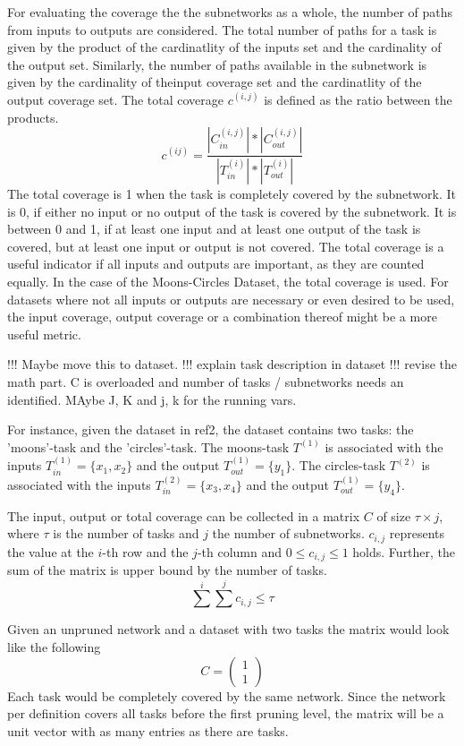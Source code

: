 For evaluating the coverage the the subnetworks as a whole, the number of paths from inputs to outputs are considered.
The total number of paths for a task is given by the product of the cardinatlity of the inputs set and the cardinality of the output set.
Similarly, the number of paths available in the subnetwork is given by the cardinality of theinput coverage set and the cardinatlity of the output coverage set.
The total coverage $c^{(i,j)}$ is defined as the ratio between the products.
$$
c^{(ij)} = \frac{
    | C^{(i,j)}_{in}| * | C^{(i,j)}_{out} |
    }{
    |T^{(i)}_{in}| * |T^{(i)}_{out}|
}
$$
The total coverage is 1 when the task is completely covered by the subnetwork.
It is 0, if either no input or no output of the task is covered by the subnetwork.
It is between 0 and 1, if at least one input and at least one output of the task is covered, but at least one input or output is not covered.
The total coverage is a useful indicator if all inputs and outputs are important, as they are counted equally.
In the case of the Moons-Circles Dataset, the total coverage is used.
For datasets where not all inputs or outputs are necessary or even desired to be used, the input coverage, output coverage or a combination thereof might be a more useful metric.

!!! Maybe move this to dataset.
!!! explain task description in dataset
!!! revise the math part. C is overloaded and number of tasks / subnetworks needs an identified. MAybe J, K and j, k for the running vars.

For instance, given the dataset in ref2, the dataset contains two tasks: the 'moons'-task and the 'circles'-task. 
The moons-task $T^{(1)}$ is associated with the inputs $T^{(1)}_{in} = \{x_1,x_2\}$ and the output $T^{(1)}_{out} = \{y_1\}$.
The circles-task $T^{(2)}$ is associated with the inputs $T^{(2)}_{in} = \{x_3,x_4\}$ and the output $T^{(1)}_{out} = \{y_4\}$.

The input, output or total coverage can be collected in a matrix $C$ of size $\tau \times j$, where $\tau$ is the number of tasks and $j$ the number of subnetworks. 
$c_{i,j}$ represents the value at the $i$-th row and the $j$-th column and $0 \leq c_{i,j} \leq 1$ holds.
Further, the sum of the matrix is upper bound by the number of tasks.
$$
\sum^{i} \sum^{j} c_{i,j} \leq \tau
$$


Given an unpruned network and a dataset with two tasks the matrix would look like the following 
$$
C = \begin{pmatrix}
    1 \\ 1
\end{pmatrix}
$$
Each task would be completely covered by the same network.
Since the network per definition covers all tasks before the first pruning level, the matrix will be a unit vector with as many entries as there are tasks.

